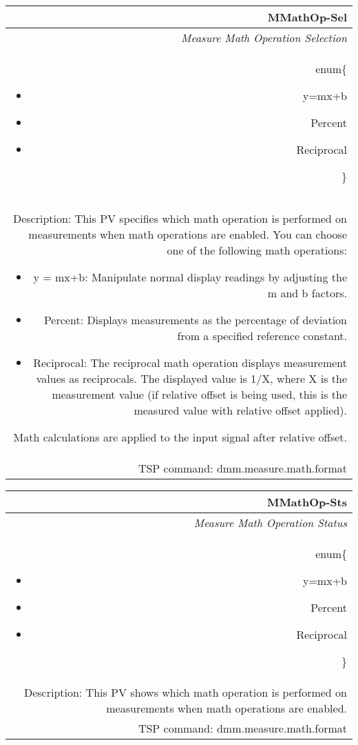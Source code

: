 \documentclass[openany]{article}
\begin{document}
		\begin{tabular}{N}
			\hline
			\bfseries MMathOp-Sel\label{pv:mmathop-sel} \\ \hline
			\emph{Measure Math Operation Selection} \\
			enum\{\begin{itemize}[noitemsep]
				\small
				\item[] y=mx+b
				\item[] Percent
				\item[] Reciprocal
			\end{itemize}\} \\
			Description: This PV specifies which math operation is performed on measurements when math operations are enabled. You can choose one of the following math operations: \begin{itemize} \item y = mx+b: Manipulate normal display readings by adjusting the m and b factors. \item Percent: Displays measurements as the percentage of deviation from a specified reference constant. \item Reciprocal: The reciprocal math operation displays measurement values as reciprocals. The displayed value is 1/X, where X is the measurement value (if relative offset is being used, this is the measured value with relative offset applied). \end{itemize} Math calculations are applied to the input signal after relative offset.\\
			TSP command: dmm.measure.math.format
		\end{tabular}

		\begin{tabular}{N}
			\hline
			\bfseries MMathOp-Sts\label{pv:mmathop-sts} \\ \hline
			\emph{Measure Math Operation Status} \\
			enum\{\begin{itemize}[noitemsep]
				\small
				\item[] y=mx+b
				\item[] Percent
				\item[] Reciprocal
			\end{itemize}\} \\
			Description: This PV shows which math operation is performed on measurements when math operations are enabled. \\
			TSP command: dmm.measure.math.format
		\end{tabular}
\end{document}
